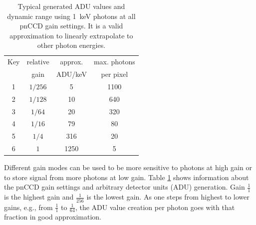 \begin{table}%
\centering
\begin{tabular}{ |c c c c |}
 \hline
 Key & relative  & approx.  & max. photons \\ 
     &   gain    & ADU/keV  & per pixel  \\
 \hline
 1 & $1/256$ & 5 & 1100  \\
 2 & $1/128$ & 10 & 640   \\
 3 & $1/64$ & 20 & 320   \\
 4 & $1/16$ & 79 & 80  \\
 5 & $1/4$ & 316 & 20  \\
 6 & $1$ & 1250 & 5  \\
 \hline
\end{tabular}
\caption[pnCCD gain modes and typical ADU values at \SI{1}{\kilo\electronvolt} photons.]{Typical generated ADU values and dynamic range using \SI{1}{\kilo\electronvolt} photons at all pnCCD gain settings. It is a valid approximation to linearly extrapolate to other photon energies.}
\label{tab:gain-modes}
\end{table}
%
Different gain modes can be used to be more sensitive to photons at high gain or to store signal from more photons at low gain. Table \ref{tab:gain-modes} shows information about the pnCCD gain settings and arbitrary detector units (ADU) generation.
Gain $\tfrac{1}{1}$ is the highest gain and $\tfrac{1}{256}$ is the lowest gain. As one steps from highest to lower gains, e.g., from $\tfrac{1}{1}$ to $\tfrac{1}{64}$, the ADU value creation per photon goes with that fraction in good approximation.\\[1\baselineskip]
%
